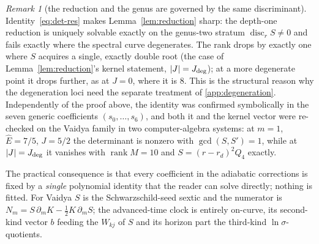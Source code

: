 \documentclass[12pt]{iopart}
\newcommand{\Ehat}{\hat E}
\newcommand{\Jc}{J_{\rm deg}}
\theoremstyle{plain}
\theoremstyle{definition}
\theoremstyle{plain}
\theoremstyle{remark}
\newtheorem*{remark}{Remark}
\begin{document}
\begin{remark}[the reduction and the genus are governed by the same discriminant]
Identity~\eqref{eq:det-res} makes Lemma~\ref{lem:reduction} sharp: the depth-one
reduction is uniquely solvable exactly on the genus-two stratum
$\operatorname{disc}_rS\neq0$ and fails exactly where the spectral curve degenerates.
The rank drops by exactly one where $S$ acquires a single, exactly double root (the case
of Lemma~\ref{lem:reduction}'s kernel statement, $|J|=\Jc$); at a more degenerate point it
drops further, as at $J=0$, where it is $8$. This is the structural reason why the degeneration
loci need the separate treatment of \ref{app:degeneration}. Independently of the proof
above, the identity was confirmed symbolically in the seven generic coefficients
$(s_0,\dots,s_6)$, and both it and the kernel vector were re-checked on the Vaidya family
in two computer-algebra systems: at $m=1$, $\Ehat=7/5$, $J=5/2$ the determinant is nonzero
with $\gcd(S,S')=1$, while at $|J|=\Jc$ it vanishes with $\operatorname{rank}M=10$ and
$S=(r-r_d)^2Q_4$ exactly.
\end{remark}

The practical consequence is that every coefficient in the adiabatic corrections is fixed
by a \emph{single} polynomial identity that the reader can solve directly; nothing is
fitted. For Vaidya $S$ is the
Schwarzschild-seed sextic and the numerator is
$N_m=S\,\partial_m K-\tfrac12K\,\partial_m S$; the advanced-time clock is entirely
on-curve, its second-kind vector $b$ feeding the $W_{kj}$ of $S$ and its horizon part the
third-kind $\ln\sigma$-quotients.
\end{document}
